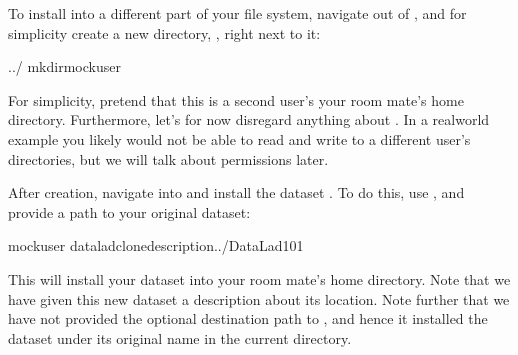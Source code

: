 \sphinxAtStartPar
To install  into a different part
of your file system, navigate out of , and \textendash{} for
simplicity \textendash{} create a new directory, , right next to it:

\begin{sphinxVerbatim}[commandchars=\\\{\}]
../
mkdirmock\PYGZus{}user
\end{sphinxVerbatim}

\sphinxAtStartPar
For simplicity, pretend that this is a second user’s \textendash{} your room mate’s \textendash{}
home directory. Furthermore, let’s for now disregard anything about
{\hyperref[\detokenize{glossary:term-permissions}]{}}. In a real\sphinxhyphen{}world example you likely would not be able to read and write
to a different user’s directories, but we will talk about permissions later.

\ignorespaces 
\sphinxAtStartPar
After creation, navigate into  and install the dataset .
To do this, use , and provide a path to your original
dataset:

\begin{sphinxVerbatim}[commandchars=\\\{\}]
mock\PYGZus{}user
dataladclone\PYGZhy{}\PYGZhy{}description../DataLad\PYGZhy{}101
\end{sphinxVerbatim}

\sphinxAtStartPar
This will install your dataset  into your room mate’s home
directory. Note that we have given this new
dataset a description about its location. Note further that we
have not provided the optional destination path to ,
and hence it installed the dataset under its original name in the current directory.

